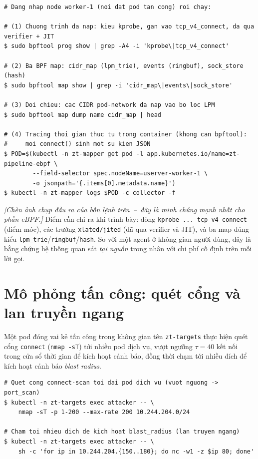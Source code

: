 \begin{lstlisting}[language={},caption={Bốn minh chứng eBPF ở tầng nhân (chạy trên node, chụp màn hình từng bước).}]
# Dang nhap node worker-1 (noi dat pod tan cong) roi chay:

# (1) Chuong trinh da nap: kieu kprobe, gan vao tcp_v4_connect, da qua verifier + JIT
$ sudo bpftool prog show | grep -A4 -i 'kprobe\|tcp_v4_connect'

# (2) Ba BPF map: cidr_map (lpm_trie), events (ringbuf), sock_store (hash)
$ sudo bpftool map show | grep -i 'cidr_map\|events\|sock_store'

# (3) Doi chieu: cac CIDR pod-network da nap vao bo loc LPM
$ sudo bpftool map dump name cidr_map | head

# (4) Tracing thoi gian thuc tu trong container (khong can bpftool):
#     moi connect() sinh mot su kien JSON
$ POD=$(kubectl -n zt-mapper get pod -l app.kubernetes.io/name=zt-pipeline-ebpf \
        --field-selector spec.nodeName=userver-worker-1 \
        -o jsonpath='{.items[0].metadata.name}')
$ kubectl -n zt-mapper logs $POD -c collector -f
\end{lstlisting}

\noindent\textit{[Chèn ảnh chụp đầu ra của bốn lệnh trên~--~đây là minh chứng mạnh nhất
cho phần eBPF.]} Điểm cần chỉ ra khi trình bày: dòng \texttt{kprobe ... tcp\_v4\_connect}
(điểm móc), các trường \texttt{xlated/jited} (đã qua verifier và JIT), và ba map đúng
kiểu \texttt{lpm\_trie}/\texttt{ringbuf}/\texttt{hash}. So với một agent ở không gian
người dùng, đây là bằng chứng hệ thống quan sát \emph{tại nguồn} trong nhân với chi phí
cố định trên mỗi lời gọi.

\section{Mô phỏng tấn công: quét cổng và lan truyền ngang}
\label{app:demo-attack}

Một pod đóng vai kẻ tấn công trong không gian tên \texttt{zt-targets} thực hiện quét cổng
\texttt{connect} (\texttt{nmap -sT}) tới nhiều pod dịch vụ, vượt ngưỡng $\tau=40$ kết nối
trong cửa sổ thời gian để kích hoạt cảnh báo, đồng thời chạm tới nhiều đích để kích hoạt
cảnh báo \emph{blast radius}.

\begin{lstlisting}[language={},caption={Kịch bản tấn công từ pod \texttt{attacker}.}]
# Quet cong connect-scan toi dai pod dich vu (vuot nguong -> port_scan)
$ kubectl -n zt-targets exec attacker -- \
    nmap -sT -p 1-200 --max-rate 200 10.244.204.0/24

# Cham toi nhieu dich de kich hoat blast_radius (lan truyen ngang)
$ kubectl -n zt-targets exec attacker -- \
    sh -c 'for ip in 10.244.204.{150..180}; do nc -w1 -z $ip 80; done'
\end{lstlisting}

